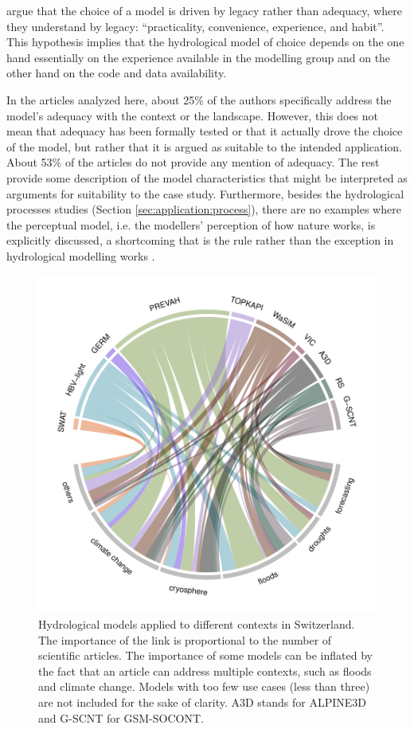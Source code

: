 \documentclass[10pt,a4paper]{article}
\begin{document}
\citet{Addor_2019} argue that the choice of a model is driven by legacy
rather than adequacy, where they understand by legacy: ``practicality,
convenience, experience, and habit''. This hypothesis implies that the
hydrological model of choice depends on the one hand essentially on the
experience available in the modelling group and on the other hand on
the code and data availability. 

In the articles analyzed here, about 25\% of the authors specifically
address the model's adequacy with the context or the landscape. However,
this does not mean that adequacy has been formally tested or that it
actually drove the choice of the model, but rather that it is argued as
suitable to the intended application. About 53\% of the articles do not
provide any mention of adequacy. The rest provide some description of
the model characteristics that might be interpreted as arguments for
suitability to the case study. Furthermore, besides the hydrological
processes studies (Section \ref{sec:application:process}), there are no examples where the
perceptual model, i.e. the modellers' perception of how nature works, is
explicitly discussed, a shortcoming that is the rule rather than the
exception in hydrological modelling works \citep{beven2021}.

\begin{figure}[htb]
	\begin{center}
		\includegraphics[width=0.70\columnwidth]{figures/chord_diagram}
		\caption{{Hydrological models applied to different contexts in Switzerland. The
				importance of the link is proportional to the number of scientific
				articles. The importance of some models can be inflated by the fact that
				an article can address multiple contexts, such as floods and climate
				change. Models with too few use cases (less than three) are not included
				for the sake of clarity. A3D stands for ALPINE3D and G-SCNT for
				GSM-SOCONT.
				{\label{fig:applications}}
		}}
	\end{center}
\end{figure}
\end{document}
